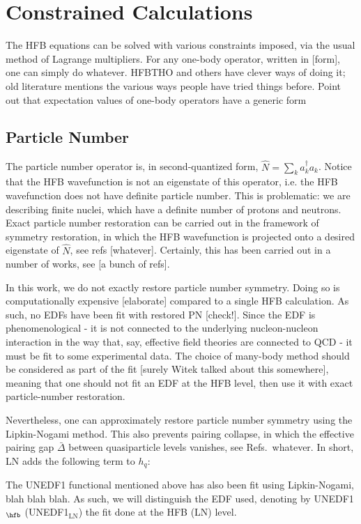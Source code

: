 \documentclass[../thesis.tex]{subfiles}
\begin{document}
\section{Constrained Calculations}
The HFB equations can be solved with various constraints imposed, via the usual method of Lagrange multipliers. For any one-body operator, written in [form], one can simply do whatever. HFBTHO and others have clever ways of doing it; old literature mentions the various ways people have tried things before. Point out that expectation values of one-body operators have a generic form

\subsection{Particle Number}
The particle number operator is, in second-quantized form, $\hat{N}=\sum_ka_k^\dagger a_k$. Notice that the HFB wavefunction is not an eigenstate of this operator, i.e. the HFB wavefunction does not have definite particle number. This is problematic: we are describing finite nuclei, which have a definite number of protons and neutrons. Exact particle number restoration can be carried out in the framework of symmetry restoration, in which the HFB wavefunction is projected onto a desired eigenstate of $\hat{N}$, see refs [whatever]. Certainly, this has been carried out in a number of works, see [a bunch of refs]. 

In this work, we do not exactly restore particle number symmetry. Doing so is computationally expensive [elaborate] compared to a single HFB calculation. As such, no EDFs have been fit with restored PN [check!]. Since the EDF is phenomenological - it is not connected to the underlying nucleon-nucleon interaction in the way that, say, effective field theories are connected to QCD - it must be fit to some experimental data. The choice of many-body method should be considered as part of the fit [surely Witek talked about this somewhere], meaning that one should not fit an EDF at the HFB level, then use it with exact particle-number restoration.

Nevertheless, one can approximately restore particle number symmetry using the Lipkin-Nogami method. This also prevents pairing collapse, in which the effective pairing gap $\bar{\Delta}$ between quasiparticle levels vanishes, see Refs.~whatever. In short, LN adds the following term to $h_q$:

The UNEDF1 functional mentioned above has also been fit using Lipkin-Nogami, blah blah blah. As such, we will distinguish the EDF used, denoting by UNEDF1$_\hfb$ (UNEDF1$_\textrm{LN}$) the fit done at the HFB (LN) level.
\end{document}
